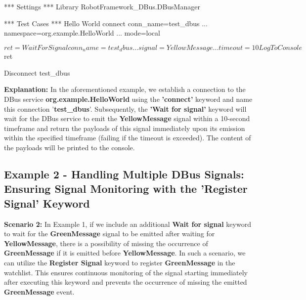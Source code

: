 \begin{robotcode}
*** Settings ***
Library    RobotFramework_DBus.DBusManager
 
*** Test Cases ***
Hello World
   connect    conn_name=test_dbus    
   ...        namespace=org.example.HelloWorld
   ...        mode=local

   ${ret}=    Wait For Signal     conn_name=test_dbus
   ...                            signal=YellowMessage    
   ...                            timeout=10  
   
   Log To Console    ${ret}
   
   Disconnect    test_dbus
\end{robotcode}

\textbf{Explanation:}
In the aforementioned example, we establish a connection to the DBus service \textbf{org.example.HelloWorld} using the \textbf{'connect'} keyword and name this connection '\textbf{test\_dbus}'. 
Subsequently, the \textbf{'Wait for signal'} keyword will wait for the DBus service to emit the \textbf{YellowMessage} signal within a 10-second timeframe and return the payloads of this signal 
immediately upon its emission within the specified timeframe (failing if the timeout is exceeded). The content of the payloads will be printed to the console.

\hypertarget{description-example2}{%
\subsection{\texorpdfstring{\textbf{Example 2 - Handling Multiple DBus Signals: Ensuring Signal Monitoring with the 'Register Signal' Keyword}}{Example 2 - Handling Multiple DBus Signals: Ensuring Signal Monitoring with the 'Register Signal' Keyword}}\label{description-example2}}

\textbf{Scenario 2:}
In Example 1, if we include an additional \textbf{Wait for signal} keyword to wait for the \textbf{GreenMessage} signal to be emitted after waiting for \textbf{YellowMessage}, 
there is a possibility of missing the occurrence of \textbf{GreenMessage} if it is emitted before \textbf{YellowMessage}. In such a scenario, we can utilize the \textbf{Register Signal} 
keyword to register \textbf{GreenMessage} in the watchlist. This ensures continuous monitoring of the signal starting immediately after executing this keyword and prevents the occurrence 
of missing the emitted \textbf{GreenMessage} event.


